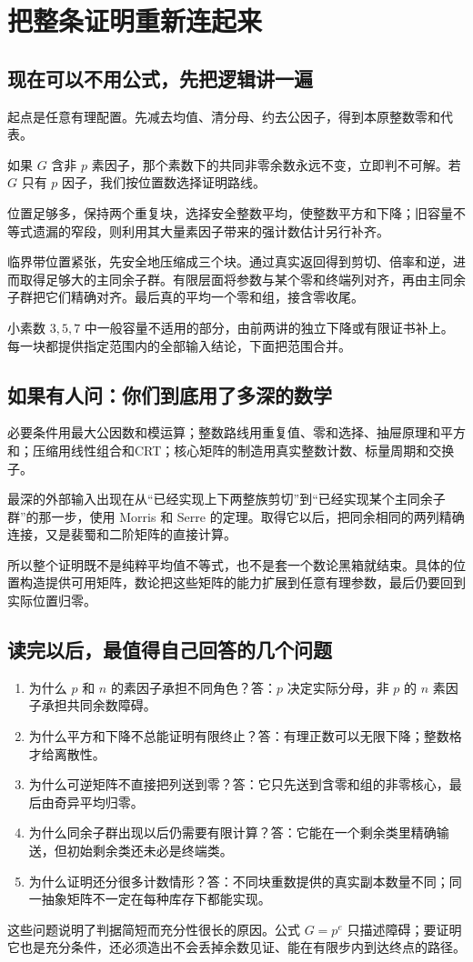 \chapter{把整条证明重新连起来}\label{sec:completion}
\section{现在可以不用公式，先把逻辑讲一遍}
起点是任意有理配置。先减去均值、清分母、约去公因子，得到本原整数零和代表。

如果 $G$ 含非 $p$ 素因子，那个素数下的共同非零余数永远不变，立即判不可解。若 $G$ 只有 $p$ 因子，我们按位置数选择证明路线。

位置足够多，保持两个重复块，选择安全整数平均，使整数平方和下降；旧容量不等式遗漏的窄段，则利用其大量素因子带来的强计数估计另行补齐。

临界带位置紧张，先安全地压缩成三个块。通过真实返回得到剪切、倍率和逆，进而取得足够大的主同余子群。有限层面将参数与某个零和终端列对齐，再由主同余子群把它们精确对齐。最后真的平均一个零和组，接含零收尾。

小素数 $3,5,7$ 中一般容量不适用的部分，由前两讲的独立下降或有限证书补上。每一块都提供指定范围内的全部输入结论，下面把范围合并。

\section{如果有人问：你们到底用了多深的数学}
必要条件用最大公因数和模运算；整数路线用重复值、零和选择、抽屉原理和平方和；压缩用线性组合和CRT；核心矩阵的制造用真实整数计数、标量周期和交换子。

最深的外部输入出现在从“已经实现上下两整族剪切”到“已经实现某个主同余子群”的那一步，使用 Morris 和 Serre 的定理。取得它以后，把同余相同的两列精确连接，又是裴蜀和二阶矩阵的直接计算。

所以整个证明既不是纯粹平均值不等式，也不是套一个数论黑箱就结束。具体的位置构造提供可用矩阵，数论把这些矩阵的能力扩展到任意有理参数，最后仍要回到实际位置归零。

\section{读完以后，最值得自己回答的几个问题}
\begin{enumerate}
\item 为什么 $p$ 和 $n$ 的素因子承担不同角色？答：$p$ 决定实际分母，非 $p$ 的 $n$ 素因子承担共同余数障碍。
\item 为什么平方和下降不总能证明有限终止？答：有理正数可以无限下降；整数格才给离散性。
\item 为什么可逆矩阵不直接把列送到零？答：它只先送到含零和组的非零核心，最后由奇异平均归零。
\item 为什么同余子群出现以后仍需要有限计算？答：它能在一个剩余类里精确输送，但初始剩余类还未必是终端类。
\item 为什么证明还分很多计数情形？答：不同块重数提供的真实副本数量不同；同一抽象矩阵不一定在每种库存下都能实现。
\end{enumerate}
这些问题说明了判据简短而充分性很长的原因。公式 $G=p^e$ 只描述障碍；要证明它也是充分条件，还必须造出不会丢掉余数见证、能在有限步内到达终点的路径。
